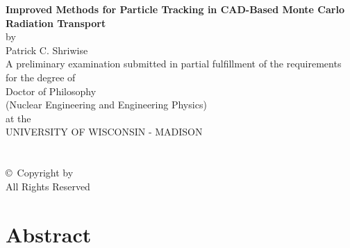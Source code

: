 \documentclass[12pt, a4paper]{article}
\author{Patrick C. Shriwise}
\date{\today}
\makeatletter
\def\copyrightpage{
  \newpage
  \thispagestyle{empty}    %
  \addtocounter{page}{-1}
  \section*{}            %
  \begin{center}
   \vfill
   \copyright\ Copyright by \@author\ \the\year\\
   All Rights Reserved
   \newpage
\end{center}}
\makeatother
\begin{document}
\begin{center}
  \thispagestyle{empty}
  \addtocounter{page}{-1}
  \textbf{Improved Methods for Particle Tracking in CAD-Based Monte Carlo Radiation Transport} \\
  \bigskip
  by \\
  \bigskip
  Patrick C. Shriwise \\
  \bigskip
  A preliminary examination submitted in partial fulfillment of the requirements for the degree of \\
  \bigskip
  Doctor of Philosophy \\
  \bigskip
  (Nuclear Engineering and Engineering Physics) \\
  \bigskip 
  at the \\
  \bigskip
  UNIVERSITY OF WISCONSIN - MADISON \\
\end{center}
\newpage
\copyrightpage

\tableofcontents 

\newpage
\section{Abstract}%
\end{document}
